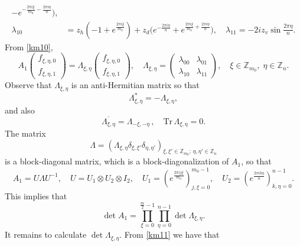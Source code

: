 \documentclass[12pt,reqno]{amsart}
\numberwithin{equation}{section}
\newcommand{\Z}{{\mathbb Z}}
\newcommand{\La}{\Lambda}
\newcommand{\la}{\lambda}
\newcommand{\de}{\delta}
\newcommand{\Tr}{\textrm{Tr}\,}
\begin{document}
\begin{appendix}
\begin{equation}
\begin{aligned}
-e^{-\frac{2\pi i\xi}{m_0}-\frac{2\pi i\eta}{n}}\big),\\
\la_{10}&=z_h(-1+e^{\frac{2\pi i\xi}{m_0}})+z_d\big(e^{-\frac{2\pi i\eta}{n}}
+e^{\frac{2\pi i\xi}{m_0}+\frac{2\pi i\eta}{n}}\big),\quad
\la_{11}=-2iz_v \sin\frac{2\pi \eta}{n}.
\end{aligned}
\end{equation}
From \eqref{km10},
\begin{equation}\label{km12}
A_1 \begin{pmatrix}
f_{\xi,\eta,0} \\
f_{\xi,\eta,1}
\end{pmatrix}=\La_{\xi, \eta}
\begin{pmatrix}
f_{\xi,\eta,0} \\
f_{\xi,\eta,1}
\end{pmatrix},\quad 
\La_{\xi, \eta}=\begin{pmatrix}
\la_{00} & \la_{01} \\
\la_{10} & \la_{11}
\end{pmatrix},\quad \xi\in\Z_{m_0},\; \eta\in\Z_n.
\end{equation}
Observe that $\La_{\xi,\eta}$ is an anti-Hermitian matrix so that
\begin{equation}\label{k11a}
\La_{\xi,\eta}^*=-\La_{\xi,\eta},
\end{equation}
and also
\begin{equation}\label{k11b}
\overline{\La_{\xi,\eta}}=\La_{-\xi,-\eta}\,,\quad \Tr \La_{\xi,\eta}=0.
\end{equation}
The matrix 
\begin{equation}\label{k12}
\La=\left(\La_{\xi,\eta}\de_{\xi,\xi'}\de_{\eta,\eta'}\right)_{\xi,\xi'\in \Z_{m_0};\, \eta,\eta'\in\Z_n}
\end{equation}
is a block-diagonal matrix, which is a  block-diagonalization of $A_1$, so that
\begin{equation}\label{k13}
A_1=U\La U^{-1}, \quad U=U_1\otimes U_2\otimes I_2,\quad U_1=\left( e^{\frac{2\pi i j\xi}{m_{0}}}\right)_{j,\xi=0}^{m_0-1},\quad
U_2=\left( e^{\frac{2\pi ik\eta}{n} }\right)_{k,\eta=0}^{n-1}.
\end{equation}
This implies that
\begin{equation}\label{km13}
\det A_1 =\prod_{\xi=0}^{\frac{m}{2}-1}\prod_{\eta=0}^{n-1}\det \La_{\xi,\eta}.
\end{equation}
It remains to calculate $\det \La_{\xi,\eta}$. From \eqref{km11} we have that
\begin{equation}\label{km14}

\end{equation}
\end{appendix}
\end{document}
